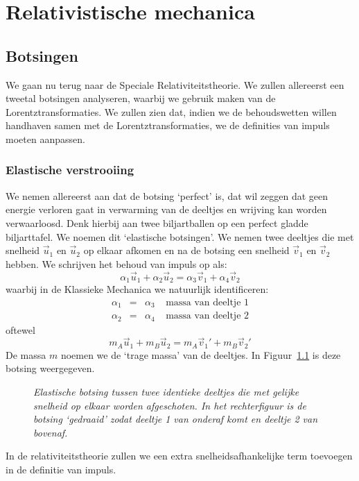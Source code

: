 \chapter{Relativistische mechanica}

\section{Botsingen}
We gaan nu terug naar de Speciale Relativiteitstheorie. We zullen allereerst een tweetal botsingen
analyseren, waarbij we gebruik maken van de Lorentztransformaties. We zullen zien dat, indien we
de behoudswetten willen handhaven samen met de Lorentztransformaties, we de definities van impuls 
moeten aanpassen.
\subsection{Elastische verstrooiing}
We nemen allereerst aan dat de
botsing `perfect' is, dat wil zeggen dat geen energie verloren gaat
in verwarming van de deeltjes en wrijving kan worden  verwaarloosd. Denk
hierbij aan twee biljartballen op een perfect gladde biljarttafel. We
noemen dit `elastische botsingen'. We nemen twee deeltjes die met
snelheid $\vec{u}_1$ en $\vec{u}_2$ op elkaar afkomen en na de botsing
een snelheid $\vec{v}_1$ en $\vec{v}_2$ hebben. We schrijven het
behoud van impuls op als:
\begin{equation}
\alpha_1\vec{u}_1 +\alpha_2 \vec{u}_2 = \alpha_3 \vec{v}_1 +\alpha_4 \vec{v}_2
\end{equation} 
waarbij in de Klassieke Mechanica we natuurlijk identificeren:
\begin{eqnarray} 
\alpha_1 & = & \alpha_3 \;\;\;\;\mbox{massa van deeltje 1} \\ 
\alpha_2 & = & \alpha_4 \;\;\;\;\mbox{massa van deeltje 2} 
\end{eqnarray}
oftewel
\[
m_A\vec{u}_1 + m_B \vec{u}_2 = m_A\vec{v}_1' + m_B \vec{v}_2'  
\]
De massa $m$ noemen we de `trage massa' van de deeltjes. In Figuur~\ref{f:bots} is deze botsing weergegeven. 
\begin{figure}[ht] 
\centering
{}
\caption{{\sl Elastische botsing tussen twee identieke deeltjes die met gelijke snelheid op elkaar worden afgeschoten. In het rechterfiguur is de botsing `gedraaid' zodat deeltje 1 van onderaf komt en deeltje 2 van bovenaf.\label{f:bots}}}
\end{figure}
In de relativiteitstheorie zullen we een extra snelheidsafhankelijke
term toevoegen in de definitie van impuls. 

